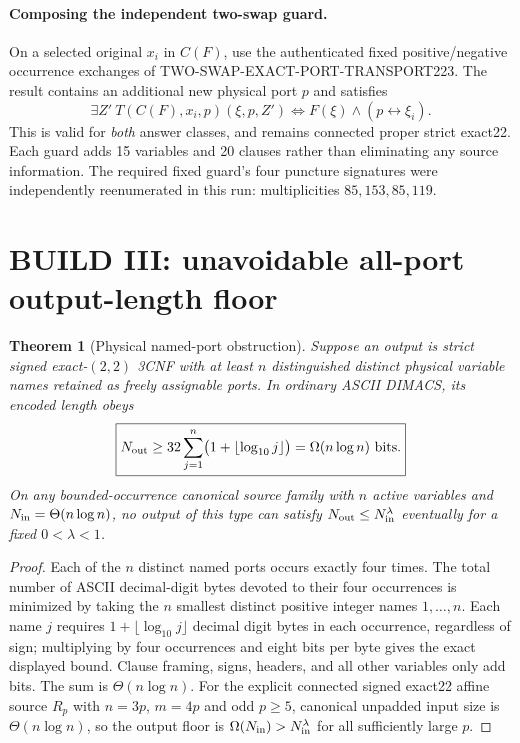 \documentclass[11pt]{article}
\newtheorem{theorem}{Theorem}
\begin{document}
\paragraph{Composing the independent two-swap guard.} On a selected original $x_i$ in $C(F)$, use the authenticated fixed positive/negative occurrence exchanges of TWO-SWAP-EXACT-PORT-TRANSPORT223. The result contains an additional new physical port $p$ and satisfies
\[
 \exists Z'\ T(C(F),x_i,p)(\xi,p,Z')\iff
 F(\xi)\land(p\leftrightarrow\xi_i).
\]
This is valid for \emph{both} answer classes, and remains connected proper strict exact22. Each guard adds 15 variables and 20 clauses rather than eliminating any source information. The required fixed guard's four puncture signatures were independently reenumerated in this run: multiplicities $85,153,85,119$.

\section{BUILD III: unavoidable all-port output-length floor}
\begin{theorem}[Physical named-port obstruction]\label{thm:floor}
Suppose an output is strict signed exact-$(2,2)$ 3CNF with at least $n$ distinguished \emph{distinct physical variable names} retained as freely assignable ports. In ordinary ASCII DIMACS, its encoded length obeys
\[
 \boxed{N_{\rm out}\ge 32\sum_{j=1}^{n}\bigl(1+\lfloor\log_{10} j\rfloor\bigr)
 =\Omega(n\log n)\text{ bits}.}
\]
On any bounded-occurrence canonical source family with $n$ active variables and $N_{\rm in}=\Theta(n\log n)$, no output of this type can satisfy $N_{\rm out}\le N_{\rm in}^{\lambda}$ eventually for a fixed $0<\lambda<1$.
\end{theorem}
\begin{proof}
Each of the $n$ distinct named ports occurs exactly four times. The total number of ASCII decimal-digit bytes devoted to their four occurrences is minimized by taking the $n$ smallest distinct positive integer names $1,\ldots,n$. Each name $j$ requires $1+\lfloor\log_{10}j\rfloor$ decimal digit bytes in each occurrence, regardless of sign; multiplying by four occurrences and eight bits per byte gives the exact displayed bound. Clause framing, signs, headers, and all other variables only add bits. The sum is $\Theta(n\log n)$. For the explicit connected signed exact22 affine source $R_p$ with $n=3p$, $m=4p$ and odd $p\ge5$, canonical unpadded input size is $\Theta(n\log n)$, so the output floor is $\Omega(N_{\rm in})>N_{\rm in}^{\lambda}$ for all sufficiently large $p$.\end{proof}
\end{document}
